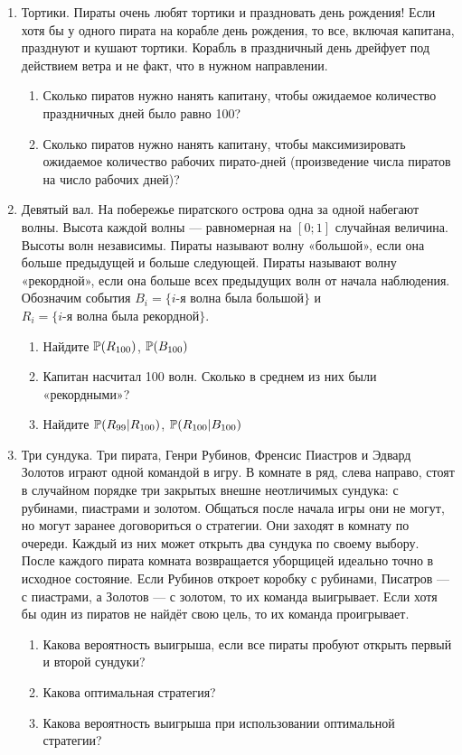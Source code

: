 \begin{enumerate}
\item Тортики. Пираты очень любят тортики и праздновать день рождения! Если хотя
бы у одного пирата на корабле день рождения, то все, включая капитана, празднуют
и кушают тортики. Корабль в праздничный день дрейфует под действием ветра и не факт,
что в нужном направлении.
\begin{enumerate}
\item Сколько пиратов нужно нанять капитану, чтобы ожидаемое количество праздничных
дней было равно 100?
\item Сколько пиратов нужно нанять капитану, чтобы максимизировать ожидаемое количество
рабочих пирато-дней (произведение числа пиратов на число рабочих дней)?
\end{enumerate}

\item Девятый вал. На побережье пиратского острова одна за одной набегают волны.
Высота каждой волны — равномерная на $[0;1]$ случайная величина. Высоты волн независимы.
Пираты называют волну «большой», если она больше предыдущей и больше следующей.
Пираты называют волну «рекордной», если она больше всех предыдущих волн от начала
наблюдения. Обозначим события $B_i= \{ i\text{-я волна была большой} \}$ и
$R_i=\{ i\text{-я волна была рекордной} \}$.
\begin{enumerate}
\item Найдите $\P(R_{100})$, $\P(B_{100})$
\item Капитан насчитал 100 волн. Сколько в среднем из них были «рекордными»?
\item Найдите $\P(R_{99} | R_{100})$, $\P(R_{100}|B_{100})$
\end{enumerate}

\item Три сундука. Три пирата, Генри Рубинов, Френсис Пиастров и Эдвард Золотов
играют одной командой в игру. В комнате в ряд, слева направо, стоят в случайном
порядке три закрытых внешне неотличимых сундука: с рубинами, пиастрами и золотом.
Общаться после начала игры они не могут, но могут заранее договориться о стратегии.
Они заходят в комнату по очереди. Каждый из них может открыть два сундука по своему
выбору. После каждого пирата комната возвращается уборщицей идеально точно в исходное
состояние. Если Рубинов откроет коробку с рубинами, Писатров — с пиастрами, а Золотов —
с золотом, то их команда выигрывает. Если хотя бы один из пиратов не найдёт свою цель,
то их команда проигрывает.
\begin{enumerate}
\item Какова вероятность выигрыша, если все пираты пробуют открыть первый и второй сундуки?
\item Какова оптимальная стратегия?
\item Какова вероятность выигрыша при использовании оптимальной стратегии?
\end{enumerate}
\end{enumerate}


